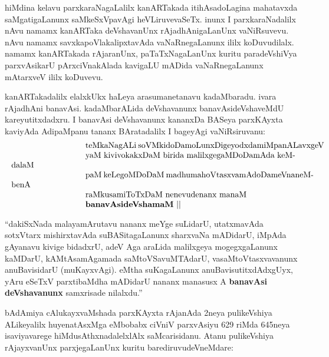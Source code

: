 \documentclass[11pt,a4size]{article}
\begin{document}
hiMdina kelavu parxkaraNagaLalilx kanARTakada itihAsadoLagina
mahatavxda saMgatigaLanunx saMkeSxVpavAgi heVLiruvevaSeTx. inunx I
parxkaraNadalilx nAvu namamx kanARTaka deVshavanUnx rAjadhAnigaLanUnx
vaNiRsuvevu. nAvu namamx savxkapoVlakalipxtavAda vaNaRnegaLanunx ililx
koDuvudilalx. namamx kanARTakada rAjaranUnx, paTaTxNagaLanUnx kuritu
paradeVshiVya parxvAsikarU pArxciVnakAlada kavigaLU mADida
vaNaRnegaLanunx mAtarxveV ililx koDuvevu.

kanARTakadalilx elalxkUkx haLeya arasumanetanavu kadaMbaradu. ivara
rAjadhAni banavAsi. kadaMbarALida deVshavanunx banavAsideVshaveMdU
kareyutitxdadxru. I banavAsi deVshavanunx kananxDa BASeya parxKAyxta
kaviyAda AdipaMpanu tananx BAratadalilx I bageyAgi vaNiRsiruvanu:
$$
\vbox{\parskip=0pt\parindent=0pt \everypar{\hskip9em} \obeylines
teMkaNagALi soVMkidoDamoLunxDigeyodxdamiMpanALavxgeV
yaM kivivokakxDaM birida malilxgegaMDoDamAda keMdalaM
paM keLegoMDoDaM madhumahoVtasxvamAdoDameVnaneMbenA
raMkusamiToTxDaM nenevudenanx manaM \textbf{banavAsideVshamaM}\index{banavAsi} ||}
$$

``dakiSxNada malayamArutavu nananx meYge suLidarU, utatxmavAda
sotxVtarx mishirxtavAda suBASitagaLanunx sharxvaNa mADidarU, iMpAda
 gAyanavu kivige bidadxrU, adeV Aga araLida malilxgeya mogegxgaLanunx
kaMDarU, kAMtAsamAgamada saMtoVSavuMTAdarU, vasaMtoVtasxvavanunx
anuBavisidarU (muKayxvAgi). eMtha suKagaLanunx anuBavisutitxdAdxgUyx,
yAru eSeTxV parxtibaMdha mADidarU nananx manasusx A \textbf{banavAsi
  deVshavanunx} samxrisade nilalxdu.''

bAdAmiya cAlukayxvaMshada parxKAyxta rAjanAda 2neya pulikeVshiya
ALikeyalilx huyenatAsxMga eMbobabx ciVniV parxvAsiyu 629 riMda 645neya 
isaviyavarege hiMdusAthxnadalelxlAlx saMcarisidanu. Atanu
pulikeVshiya rAjayxvanUnx parxjegaLanUnx kuritu barediruvudeVneMdare:
\end{document}
